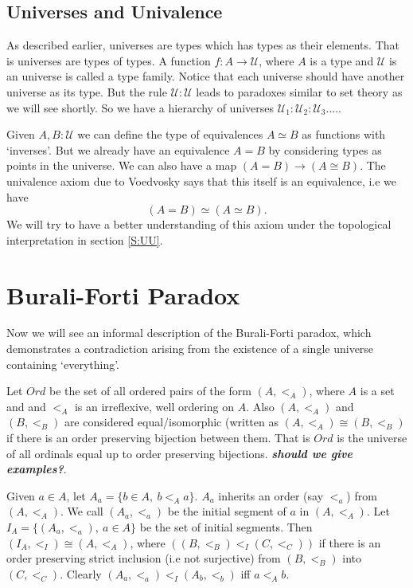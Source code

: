 \documentclass[10pt]{article}
\theoremstyle{definition}
\theoremstyle{plain}
\theoremstyle{remark}
\newcommand{\U}{\mathscr{U}}
\begin{document}
\subsection{Universes and Univalence}

As described earlier, universes are types which has types as their elements. That is universes
are types of types. A function $f : A \to \U$, where $A$ is a type and $\U$ is an universe
is called a type family. Notice that each universe should have another universe as its type.
But the rule $\U : \U$ leads to paradoxes similar to set theory as we will see shortly. 
So we have a hierarchy of universes $\U_1 : \U_2 : \U_3 \dots $.\smallskip.

Given $A, B:\U$ we can define the type of equivalences $A\simeq B$ as functions
with `inverses'. But we already have an equivalence $A = B$ by considering types as points
in the universe. We can also have a map $(A = B) \to (A \cong B)$. The univalence axiom 
due to Voedvosky says that this itself is an equivalence, i.e we have
\[ (A = B) \simeq (A \simeq B).\]
We will try to have a better understanding of this axiom under the topological interpretation
in section \ref{S:UU}.

\section{Burali-Forti Paradox}\label{S:BFP}

Now we will see an informal description of the Burali-Forti paradox, which demonstrates a
contradiction arising from the existence of a single universe containing `everything'.\smallskip

Let $Ord$ be the set of all ordered pairs of the form $(A, <_A)$, where $A$ is a set and
and $<_A$ is an irreflexive, well ordering on $A$. Also $(A, <_A)$ and $(B, <_B)$ are 
considered equal/isomorphic (written as $(A,<_A) \cong (B,<_B)$ if there is an order 
preserving bijection between them. That is $Ord$ is the universe of all ordinals equal up to 
order preserving bijections. \textbf{\textit{should we give examples?}}.\smallskip

Given $a\in A$, let $A_a = \{b \in A,\ b <_A a \}$. $A_a$ inherits an order (say $<_a$)
from $(A, <_A)$. We call $(A_a, <_a)$ be the initial segment of $a$ in $(A, <_A)$. Let
$I_A = \{(A_a, <_a),\ a\in A\}$ be the set of initial segments. Then 
$(I_A,<_I) \cong (A, <_A)$, where $((B,<_B) <_I (C,<_C))$ if there is an order preserving 
strict inclusion (i.e not surjective) from $(B,<_B)$ into $(C,<_C)$. Clearly 
$(A_a,<_a) <_I (A_b,<_b)$ iff $a <_A b$.\smallskip
\end{document}
